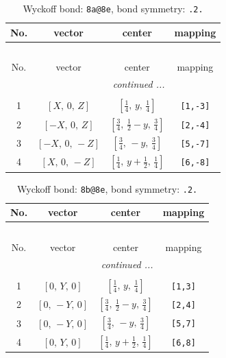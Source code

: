 \documentclass[fleqn,8pt]{jsarticle}
\begin{document}
\begin{longtable}{cccc}
\caption{Wyckoff bond: {\tt 8a@8e}, bond symmetry: {\tt .2.}}
 \\
 \hline \hline
No. & vector & center & mapping \\ \hline \endfirsthead

\multicolumn{3}{l}{\tablename\ \thetable{}} \\
 \hline \hline
No. & vector & center & mapping \\ \hline \endhead

 \hline \hline
\multicolumn{3}{r}{\footnotesize\it continued ...} \\ \endfoot

 \hline \hline
\multicolumn{3}{r}{} \\ \endlastfoot

1 & $\left[ X,\, 0,\, Z \right]$ & $\left[ \frac{1}{4},\, y,\, \frac{1}{4} \right]$ & {\tt [1,-3]} \\ \hline
2 & $\left[ - X,\, 0,\, Z \right]$ & $\left[ \frac{3}{4},\, \frac{1}{2} - y,\, \frac{3}{4} \right]$ & {\tt [2,-4]} \\ \hline
3 & $\left[ - X,\, 0,\, - Z \right]$ & $\left[ \frac{3}{4},\, - y,\, \frac{3}{4} \right]$ & {\tt [5,-7]} \\ \hline
4 & $\left[ X,\, 0,\, - Z \right]$ & $\left[ \frac{1}{4},\, y + \frac{1}{2},\, \frac{1}{4} \right]$ & {\tt [6,-8]} \\
\end{longtable}
\renewcommand{\arraystretch}{1.2}
\begin{longtable}{cccc}
\caption{Wyckoff bond: {\tt 8b@8e}, bond symmetry: {\tt .2.}}
 \\
 \hline \hline
No. & vector & center & mapping \\ \hline \endfirsthead

\multicolumn{3}{l}{\tablename\ \thetable{}} \\
 \hline \hline
No. & vector & center & mapping \\ \hline \endhead

 \hline \hline
\multicolumn{3}{r}{\footnotesize\it continued ...} \\ \endfoot

 \hline \hline
\multicolumn{3}{r}{} \\ \endlastfoot

1 & $\left[ 0,\, Y,\, 0 \right]$ & $\left[ \frac{1}{4},\, y,\, \frac{1}{4} \right]$ & {\tt [1,3]} \\ \hline
2 & $\left[ 0,\, - Y,\, 0 \right]$ & $\left[ \frac{3}{4},\, \frac{1}{2} - y,\, \frac{3}{4} \right]$ & {\tt [2,4]} \\ \hline
3 & $\left[ 0,\, - Y,\, 0 \right]$ & $\left[ \frac{3}{4},\, - y,\, \frac{3}{4} \right]$ & {\tt [5,7]} \\ \hline
4 & $\left[ 0,\, Y,\, 0 \right]$ & $\left[ \frac{1}{4},\, y + \frac{1}{2},\, \frac{1}{4} \right]$ & {\tt [6,8]} \\
\end{longtable}
\end{document}
